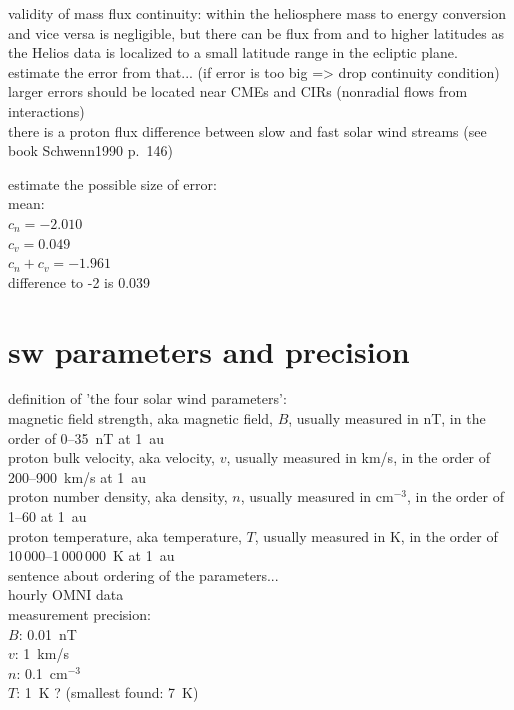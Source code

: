 validity of mass flux continuity: within the heliosphere mass to energy conversion and vice versa is negligible, but there can be flux from and to higher latitudes as the Helios data is localized to a small latitude range in the ecliptic plane.\\
estimate the error from that... (if error is too big => drop continuity condition)\\
larger errors should be located near CMEs and CIRs (nonradial flows from interactions)\\
there is a proton flux difference between slow and fast solar wind streams (see book Schwenn1990 p.~146)

estimate the possible size of error:\\
mean:\\
$c_n = -2.010$\\
$c_v = 0.049$\\
$c_n + c_v = -1.961$\\
difference to -2 is 0.039\\

\section{sw parameters and precision}
definition of 'the four solar wind parameters':\\	%
	magnetic field strength, aka magnetic field, $B$, usually measured in nT, in the order of 0--35~nT at 1~au\\
	proton bulk velocity, aka velocity, $v$, usually measured in km/s, in the order of 200--900~km/s at 1~au\\
	proton number density, aka density, $n$, usually measured in cm$^{-3}$, in the order of 1--60 at 1~au\\
	proton temperature, aka temperature, $T$, usually measured in K, in the order of 10\,000--1\,000\,000~K at 1~au\\
sentence about ordering of the parameters...\\

hourly OMNI data\\
measurement precision:\\
$B$: 0.01~nT\\
$v$: 1~km/s\\
$n$: 0.1~cm$^{-3}$\\
$T$: 1~K ? (smallest found: 7~K)\\

